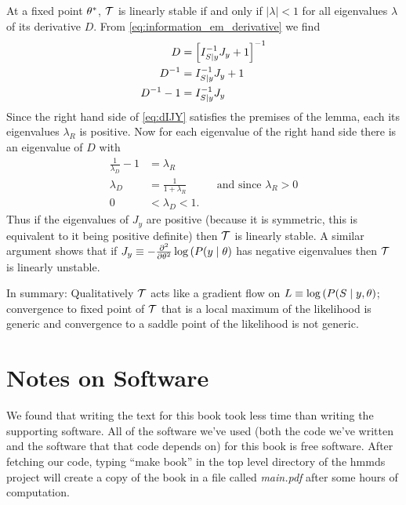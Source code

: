 At a fixed point ${\theta^*}$, $\EMmap$ is linearly stable if and
only if $\left| \lambda \right| < 1$ for all eigenvalues $\lambda$ of
its derivative $D$.  From \eqref{eq:information_em_derivative} we find
\begin{align}
  \nonumber
  D &= \left[I_{S \mid y}^{-1} J_y + 1 \right]^{-1} \\
  \nonumber
  D^{-1} &= I_{S \mid y}^{-1} J_y + 1 \\
  \label{eq:dIJY}
  D^{-1} -1  &= I_{S \mid y}^{-1} J_y
\end{align}
Since the right hand side of \eqref{eq:dIJY} satisfies the premises of
the lemma, each its eigenvalues $\lambda_R$ is positive.  Now for each
eigenvalue of the right hand side there is an eigenvalue of $D$ with
\begin{align}
  \nonumber
  \frac{1}{\lambda_D} - 1 &= \lambda_R  \\
  \nonumber
  \lambda_D &= \frac{1}{1+\lambda_R} &&\text{and since } \lambda_R >0 \\
  \label{eq:D_is_stable}
  0 &< \lambda_D < 1.
\end{align}
Thus if the eigenvalues of $J_y$ are positive (because it is
symmetric, this is equivalent to it being positive definite) then
$\EMmap$ is linearly stable.  A similar argument shows that if
$J_y\equiv-\frac{\partial^2}{\partial \theta^2} \log \left( P(y \mid
  \theta \right)$ has negative eigenvalues then $\EMmap$ is linearly
unstable.

In summary: Qualitatively $\EMmap$ acts like a gradient flow on
$L\equiv\log \left( P(S \mid y, \theta \right)$;  convergence to
fixed point of $\EMmap$ that is a local maximum of the likelihood is
generic and convergence to a saddle point of the likelihood is not
generic.

\chapter{Notes on Software}
\label{cha:Software}

We found that writing the text for this book took less time than
writing the supporting software.  All of the software we've used (both
the code we've written and the software that that code depends on) for
this book is free software.  After fetching our code, typing ``make
book'' in the top level directory of the hmmds project will create a
copy of the book in a file called \emph{main.pdf} after some hours of
computation.  

